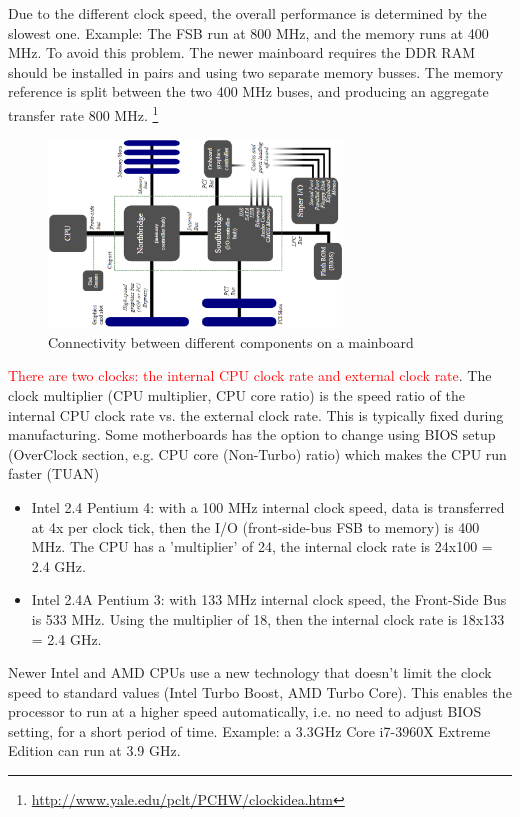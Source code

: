 Due to the different clock speed, the overall performance is determined by the
slowest one. Example: The FSB run at 800 MHz, and the memory runs at 400 MHz. To
avoid this problem. The newer mainboard requires the DDR RAM should be installed
in pairs and using two separate memory busses. The memory reference is split
between the two 400 MHz buses, and producing an aggregate transfer rate 800 MHz.
\footnote{\url{http://www.yale.edu/pclt/PCHW/clockidea.htm}}

\begin{figure}[hbt]
  \centerline{\includegraphics[height=5cm,
    angle=0]{./images/mainboard_diagram.eps}}
\caption{Connectivity between different components on a mainboard}
\label{fig:mainboard_diagram}
\end{figure}


\textcolor{red}{There are two clocks: the internal CPU clock rate and external
clock rate}.
The clock multiplier (CPU multiplier, CPU core ratio) is the speed ratio of the
internal CPU clock rate vs. the external clock rate. This is typically fixed
during manufacturing. Some motherboards has the option to change using BIOS
setup (OverClock section, e.g. CPU core (Non-Turbo) ratio) which makes the CPU
run faster (TUAN)
\begin{itemize}
  \item Intel 2.4 Pentium 4: with a 100 MHz
internal clock speed, data is transferred at 4x per clock tick, then the I/O
(front-side-bus FSB to memory) is 400 MHz. The CPU has a 'multiplier' of 24,
the internal clock rate is 24x100 = 2.4 GHz.

  \item Intel 2.4A Pentium 3: with 133 MHz internal clock speed, the Front-Side
  Bus is 533 MHz. Using the multiplier of 18, then the internal clock rate is
  18x133 = 2.4 GHz.
\end{itemize}
Newer Intel and AMD CPUs use a new technology that doesn't limit the clock speed
to standard values (Intel Turbo Boost, AMD Turbo Core). This enables the
processor to run at a higher speed automatically, i.e. no need to adjust BIOS
setting, for a short period of time. Example: a 3.3GHz Core i7-3960X Extreme
Edition can run at 3.9 GHz.

